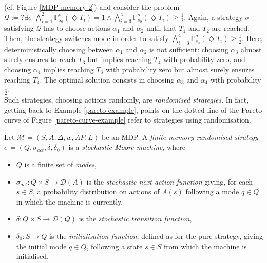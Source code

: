 (cf. Figure \ref{MDP-memory-2}) and consider the \MOSR{} problem
$\mathcal{Q}:= ?\exists \sigma \; \bigwedge_{i=1}^2 \mathbb{P}^\sigma_{s_0}(\Diamond T_i) = 1 \wedge \bigwedge_{i=3}^4 \mathbb{P}^\sigma_{s_0} (\Diamond T_i) \geq \frac{1}{2}$.
Again, a strategy $\sigma$ satisfying $\mathcal{Q}$ has to
choose actions $\alpha_1$ and $\alpha_2$ until that $T_1$ and $T_2$ are reached.
Then, the strategy switches mode in order to satisfy $\bigwedge_{i=3}^4 \mathbb{P}^\sigma_{s_0} (\Diamond T_i) \geq \frac{1}{2}$. Here, deterministically choosing between $\alpha_1$ and $\alpha_2$ is not sufficient: choosing $\alpha_3$ almost surely ensures to reach $T_3$ but implies reaching $T_4$ with probability zero,
and choosing $\alpha_4$ implies reaching $T_3$ with probability zero but almost surely ensures reaching $T_4$.
The optimal solution consists in choosing $\alpha_3$ and $\alpha_4$ with probability $\frac{1}{2}$.\\

Such strategies, choosing actions randomly, are \textit{randomised strategies}.
In fact, getting back to Example \ref{pareto-example}, points on the dotted line of the Pareto curve of Figure \ref{pareto-curve-example} refer to strategies using randomisation.

\begin{definition}
  Let \sloppy $\mathcal{M}={(S, A, \Delta, w, AP, L)}$ be an MDP. A \textit{finite-memory randomised strategy} $\sigma = (Q, \sigma_{act}, \delta, \delta_0)$ is a \textit{stochastic Moore machine}, where
  \begin{itemize}
    \item $Q$ is a finite set of \textit{modes},
    \item $\sigma_{act}: Q \times S \rightarrow \mathcal{D}(A)$ is the \textit{stochastic next action function} giving, for each $s \in S$, a probability distribution on actions of $A(s)$ following a mode $q \in Q$ in which the machine is currently,
    \item $\delta: Q \times S \rightarrow \mathcal{D}(Q)$ is the \textit{stochastic transition function},
    \item $\delta_0: S \rightarrow Q$ is the \textit{initialisation function}, defined as for the pure strategy, giving the initial mode $q \in Q$, following a state $s \in S$ from which the machine is initialised.
  \end{itemize}
\end{definition}

